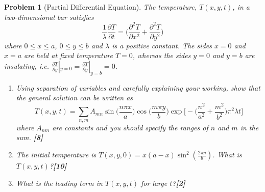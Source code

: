 \documentclass[a4paper]{article}
\theoremstyle{new}
\newtheorem{qns}{Problem}[section]
\begin{document}
\begin{qns}[Partial Differential Equation]
The temperature, $T(x, y, t)$, in a two-dimensional bar satisfies
$$\frac{1}{\lambda}\frac{\partial T}{\partial t}=\bigg(\frac{\partial^2T}{\partial x^2}+\frac{\partial^2T}{\partial y^2}\bigg)$$
where $0\leq x\leq a$, $0\leq y\leq b$ and $\lambda$ is a positive constant. The sides $x = 0$ and $x = a$ are held at fixed temperature $T = 0$, whereas the sides $y = 0$ and $y = b$ are insulating, i.e. $\frac{\partial T}{\partial y}|_{y=0}=\frac{\partial T}{\partial y}|_{y=b}=0$. \begin{enumerate}[label=(\alph*)]
\item Using separation of variables and carefully explaining your working, show that the general solution can be written as
$$T(x,y,t)=\sum_{n,m}A_{mn}\sin\bigg(\frac{n\pi x}{a}\bigg)\cos\bigg(\frac{m\pi y}{b}\bigg)\exp\bigg[-\bigg(\frac{n^2}{a^2}+\frac{m^2}{b^2}\bigg)\pi^2\lambda t\bigg]$$
where $A_{nm}$ are constants and you should specify the ranges of $n$ and $m$ in the sum. \hfill\textbf{[8]}\item The initial temperature is $T(x,y,0)=x(a-x)\sin^2(\frac{2\pi y}{b})$. What is $T(x, y, t)$?\hfill\textbf{[10]}
\item What is the leading term in $T(x, y, t)$ for large $t$?\hfill\textbf{[2]}
\end{enumerate}
\end{qns}
\end{document}
